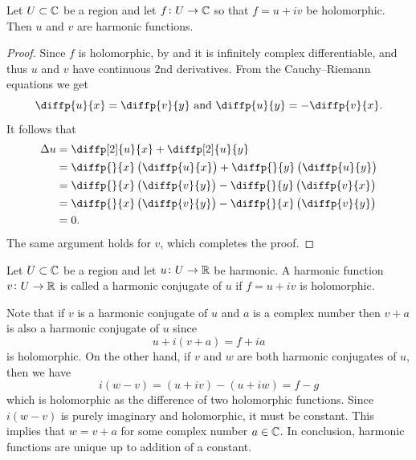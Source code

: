 \documentclass[11pt,a4paper]{article}
\begin{document}
\begin{proposition}
  Let $U \subset \mathbb{C}$
  be a region and let $f \colon U \to \mathbb{C}$ so that $f = u + i v$ be holomorphic.
  Then $u$ and $v$ are harmonic functions.
\end{proposition}
\begin{proof}
  Since $f$ is holomorphic, by 
  and  it is infinitely complex
  differentiable, and thus $u$ and $v$ have continuous $2$nd derivatives.
  From the Cauchy--Riemann equations we get
  \[
    \diffp{u}{x} = \diffp{v}{y} \stand
    \diffp{u}{y} = -\diffp{v}{x}.
  \]
  It follows that
  \begin{align*}
    \Delta u &= \diffp[2]{u}{x} + \diffp[2]{u}{y} \\
        &= \diffp{}{x} \del{\diffp{u}{x}} + \diffp{}{y} \del{\diffp{u}{y}} \\
        &= \diffp{}{x} \del{\diffp{v}{y}} - \diffp{}{y} \del{\diffp{v}{x}} \\
        &= \diffp{}{x} \del{\diffp{v}{y}} - \diffp{}{x} \del{\diffp{v}{y}} \\
        &= 0.
  \end{align*}
  The same argument holds for $v$, which completes the proof.
\end{proof}

\begin{definition}
  Let $U \subset \mathbb{C}$ be a region and let $u \colon U \to \mathbb{R}$  be harmonic.
  A harmonic function $v \colon U \to \mathbb{R}$ is called a harmonic conjugate
  of $u$ if $f = u + i v$ is holomorphic.
\end{definition}

\begin{remark}
  Note that if $v$ is a harmonic conjugate of $u$ and $a$ is a complex
  number then $v + a$ is also a harmonic conjugate of $u$ since
  \[
    u + i(v + a) = f + ia
  \]
  is holomorphic.
  On the other hand, if $v$ and $w$ are both harmonic conjugates of $u$,
  then we have
  \[
    i(w - v) = (u + i v) - (u + i w) = f - g
  \]
  which is holomorphic as the difference of two holomorphic functions.
  Since $i(w - v)$ is purely imaginary and holomorphic,
  it must be constant.
  This implies that $w = v + a$ for some complex number $a \in \mathbb{C}$.
  In conclusion, harmonic functions are unique up to addition of a constant.
\end{remark}
\end{document}
